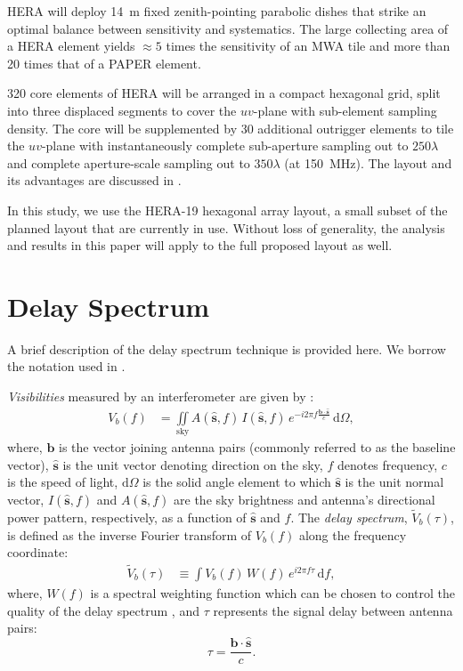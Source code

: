 \documentclass[preprint2,iop,numberedappendix,twocolappendix,appendixfloats]{emulateapj}
\newcommand{\dif}{\mathrm{d}}
\begin{document}
HERA will deploy 14~m fixed zenith-pointing parabolic dishes that strike an optimal balance between sensitivity and systematics. The large collecting area of a HERA element yields $\approx 5$ times the sensitivity of an MWA tile and more than 20 times that of a PAPER element. 

320 core elements of HERA will be arranged in a compact hexagonal grid, split into three displaced segments to cover the $uv$-plane with sub-element sampling density. The core will be supplemented by 30 additional outrigger elements to tile the $uv$-plane with instantaneously complete sub-aperture sampling out to $250\lambda$ and complete aperture-scale sampling out to $350\lambda$ (at 150~MHz). The layout and its advantages are discussed in \citet{dil16}.

In this study, we use the HERA-19 hexagonal array layout, a small subset of the planned layout that are currently in use. Without loss of generality, the analysis and results in this paper will apply to the full proposed layout as well.

\section{Delay Spectrum}\label{sec:delay-spectrum}

A brief description of the delay spectrum technique \citep{par12a,par12b} is provided here. We borrow the notation used in \citet{thy15a}. 

{\it Visibilities} measured by an interferometer are given by \citep{van34,zer38,tho01}:
\begin{align}\label{eqn:obsvis}
  V_b(f) &= \iint\limits_\textrm{sky} A(\hat{\boldsymbol{s}},f)\,I(\hat{\boldsymbol{s}},f)\,e^{-i2\pi f\frac{\boldsymbol{b}\cdot\hat{\boldsymbol{s}}}{c}}\,\dif\Omega,
\end{align}
where, $\boldsymbol{b}$ is the vector joining antenna pairs (commonly referred to as the baseline vector), $\hat{\boldsymbol{s}}$ is the unit vector denoting direction on the sky, $f$ denotes frequency, $c$ is the speed of light, $\dif\Omega$ is the solid angle element to which $\hat{\boldsymbol{s}}$ is the unit normal vector, $I(\hat{\boldsymbol{s}},f)$ and $A(\hat{\boldsymbol{s}},f)$ are the sky brightness and antenna's directional power pattern, respectively, as a function of $\hat{\boldsymbol{s}}$ and $f$. The {\it delay spectrum}, $\tilde{V}_b(\tau)$, is defined as the inverse Fourier transform of $V_b(f)$ along the frequency coordinate:
\begin{align}\label{eqn:delay-transform}
  \tilde{V}_b(\tau) &\equiv \int V_b(f)\,W(f)\,e^{i2\pi f\tau}\,\dif f,
\end{align}
where, $W(f)$ is a spectral weighting function which can be chosen to control the quality of the delay spectrum \citep{ved12,thy13}, and $\tau$ represents the signal delay between antenna pairs:
\begin{equation}\label{eqn:delay}
  \tau = \frac{\boldsymbol{b}\cdot\hat{\boldsymbol{s}}}{c}.
\end{equation}
\end{document}
